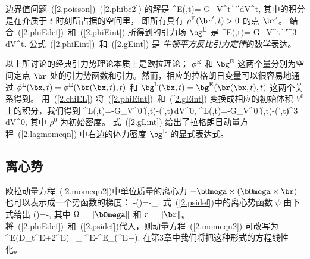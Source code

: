 边界值问题~(\ref{2.poisson})--(\ref{2.phibc2})
的解是
\eq
\label{2.phiEint}
\phi^{\rm E}(\br,t)=-G\int_{V^t}
{\|\br-\br'\|}\,dV^{t\prime},
\en
其中的积分是在介质于 $t$ 时刻所占据的空间里，
即所有具有 $\rho^{\rm E}(\br',t)>0$ 的点 $\br'$。 
结合~(\ref{2.phiEdef})~和~(\ref{2.phiEint}) 所得到的引力场 $\bg^{\rm E}$ 
是
\eq
\label{2.gEint}
\bg^{\rm E}(\br,t)=-G\int_{V^t}
{\|\br-\br'\|^3}\,dV^{t\prime}.
\en
公式~(\ref{2.phiEint})~和~(\ref{2.gEint}) 
是 {\em 牛顿平方反比引力定律}的数学表达。
%

以上所讨论的经典引力势理论本质上是欧拉理论；
$\phi^{\rm E}$ 和 $\bg^{\rm E}$ 这两个量分别为空间定点 $\br$ 处的引力势函数和引力。然而，相应的拉格朗日变量可以很容易地通过
$\phi^{\rm L}(\bx,t)=\phi^{\rm E}(\br(\bx,t),t)$
和 $\bg^{\rm L}(\bx,t)=\bg^{\rm E}(\br(\bx,t),t)$ 这两个关系得到。
用~(\ref{2.chiEL}) 将~(\ref{2.phiEint})~和~(\ref{2.gEint})
变换成相应的初始体积 $V^0$ 上的积分，我们得到
%
\eq
\label{2.phiLint}
\phi^{\rm L}(\bx,t)=-G\int_{V^0}
{\|\br(\bx,t)-\br(\bx',t)\|}\,dV^{0\prime},
\en
\eq
\label{2.gLint}
\bg^{\rm L}(\bx,t)=-G\int_{V^0}
{\|\br(\bx,t)-\br(\bx',t)\|^3}\,dV^{0\prime},
\en
其中 $\rho^0$ 为初始密度。
式~(\ref{2.gLint}) 给出了拉格朗日动量方程~(\ref{2.lagmomeqn}) 中右边的体力密度 $\bg^{\rm L}$ 
的显式表达式。
%

\subsection{离心势}
%

欧拉动量方程~(\ref{2.momeqn2})中单位质量的离心力 $-\bOmega\times(\bOmega
\index{centrifugal force}%
\index{force!centrifugal}%
\times\br)$ 也可以表示成一个势函数的梯度：
\eq
\label{2.psidef}
-\bOmega\times(\bOmega\times\br)=-\bdel_{\!\subr}\psi.
\en
式~(\ref{2.psidef})中的离心势函数 $\psi$ 由下式给出
\eq
\label{2.psidef2}
\psi(\br)=-,
\en
其中 $\Omega=\|\bOmega\|$ 和 $r=\|\br\|$。
将~(\ref{2.phiEdef})~和~(\ref{2.psidef})代入，则动量方程~(\ref{2.momeqn2}) 可改写为
\eq
\label{2.finmomeqn}
\rho^{\rm E}(D_t\bu^{\rm E}+2\bOmega\times\bu^{\rm E})=\bdel_{\!\subr}\cdot
\bT^{\rm E}-\rho^{\rm E}\bdel_{\!\subr}(\phi^{\rm E}+\psi).
\en
在第3章中我们将把这种形式的方程线性化。
%

\renewcommand{\thesubsection}{$\!\!\!\raise1.3ex\hbox{$\star$}\!\!$
\arabic{chapter}.\arabic{section}.\arabic{subsection}}


